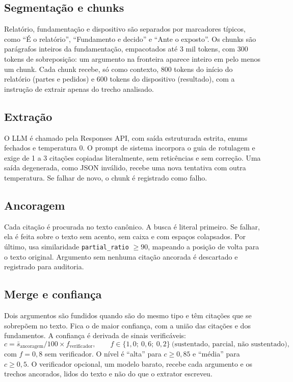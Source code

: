 \documentclass[11pt,a4paper]{article}
\begin{document}
\subsection{Segmentação e chunks}

Relatório, fundamentação e dispositivo são separados por marcadores típicos, como ``É o
relatório'', ``Fundamento e decido'' e ``Ante o exposto''. Os chunks são parágrafos inteiros da
fundamentação, empacotados até 3 mil tokens, com 300 tokens de sobreposição: um argumento na
fronteira aparece inteiro em pelo menos um chunk. Cada chunk recebe, só como contexto, 800 tokens
do início do relatório (partes e pedidos) e 600 tokens do dispositivo (resultado), com a instrução
de extrair apenas do trecho analisado.

\subsection{Extração}

O LLM é chamado pela Responses API, com saída estruturada estrita, enums fechados e temperatura
0. O prompt de sistema incorpora o guia de rotulagem e exige de 1 a 3 citações copiadas
literalmente, sem reticências e sem correção. Uma saída degenerada, como JSON inválido, recebe uma
nova tentativa com outra temperatura. Se falhar de novo, o chunk é registrado como falho.

\subsection{Ancoragem}

Cada citação é procurada no texto canônico. A busca é literal primeiro. Se falhar, ela é feita
sobre o texto sem acento, sem caixa e com espaços colapsados. Por último, usa similaridade
\texttt{partial\_ratio} $\ge 90$, mapeando a posição de volta para o texto original. Argumento sem
nenhuma citação ancorada é descartado e registrado para auditoria.

\subsection{Merge e confiança}

Dois argumentos são fundidos quando são do mesmo tipo e têm citações que se sobrepõem no texto.
Fica o de maior confiança, com a união das citações e dos fundamentos. A confiança é derivada de
sinais verificáveis:
\[
c = \bar{s}_{\text{ancoragem}} / 100 \times f_{\text{verificador}},\qquad
f \in \{1{,}0;\ 0{,}6;\ 0{,}2\}\ \text{(sustentado, parcial, não sustentado)},
\]
com $f = 0{,}8$ sem verificador. O nível é ``alta'' para $c \ge 0{,}85$ e ``média'' para
$c \ge 0{,}5$. O verificador opcional, um modelo barato, recebe cada argumento e os trechos
ancorados, lidos do texto e não do que o extrator escreveu.
\end{document}
